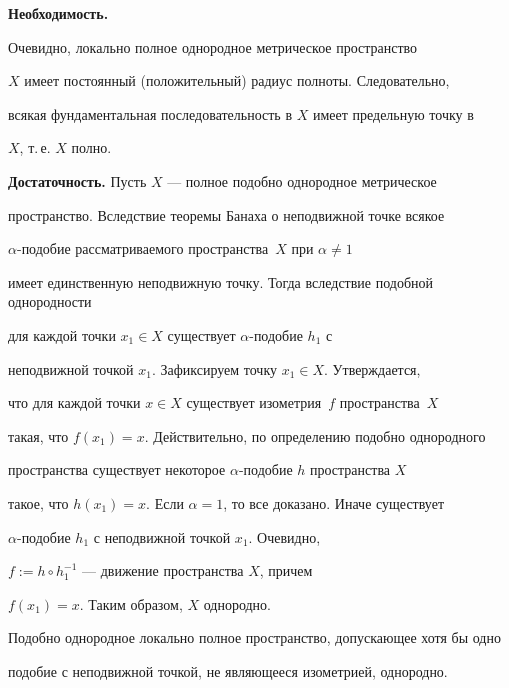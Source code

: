 \begin{pf}


{\bf Необходимость.}


Очевидно, локально полное однородное метрическое пространство


$X$ имеет постоянный (положительный) радиус полноты. Следовательно,


всякая фундаментальная последовательность в $X$ имеет предельную точку в


$X$, т.\,е. $X$ полно.


\smallskip





{\bf Достаточность.} Пусть $X$ --- полное подобно однородное метрическое


пространство. Вследствие теоремы Банаха о неподвижной точке всякое


$\alpha$-подобие рассматриваемого пространства~$X$ при $\alpha \neq 1$


имеет единственную неподвижную точку. Тогда вследствие подобной однородности


для каждой точки $x_{1} \in X$ существует $\alpha$-подобие $h_{1}$ с


неподвижной точкой $x_{1}$. Зафиксируем точку $x_{1} \in X$. Утверждается,


что для каждой точки $x \in X$ существует изометрия~$f$ пространства~$X$


такая, что $f(x_{1})=x$. Действительно, по определению подобно однородного


пространства существует некоторое $\alpha$-подобие $h$ пространства $X$


такое, что $h(x_{1})=x$. Если $\alpha =1$, то все доказано. Иначе существует


$\alpha$-подобие $h_{1}$ с неподвижной точкой $x_{1}$. Очевидно,


$f:=h \circ h_{1}^{-1}$ --- движение пространства $X$, причем


$f(x_{1})=x$. Таким образом, $X$ однородно.


\end{pf}





\begin{cors}


\label{fix}


Подобно однородное локально полное пространство, допускающее хотя бы одно


подобие с неподвижной точкой, не являющееся изометрией, однородно.


\end{cors}





